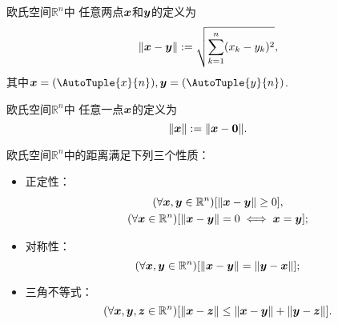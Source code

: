 \begin{definition}
欧氏空间\(\mathbb{R}^n\)中
任意两点\(\boldsymbol{x}\)和\(\boldsymbol{y}\)的定义为\begin{equation*}
	\norm{\boldsymbol{x} - \boldsymbol{y}}
	:=
	\sqrt{\sum_{k=1}^n (x_k-y_k)^2},
\end{equation*}
其中\(\vb{x}=(\AutoTuple{x}{n}),
\vb{y}=(\AutoTuple{y}{n})\).
\end{definition}
\begin{definition}
欧氏空间\(\mathbb{R}^n\)中
任意一点\(\boldsymbol{x}\)的定义为\begin{equation*}
	\norm{\boldsymbol{x}}
	:=
	\norm{\boldsymbol{x}-\boldsymbol0}.
\end{equation*}
\end{definition}
\begin{theorem}
欧氏空间\(\mathbb{R}^n\)中的距离满足下列三个性质：\begin{itemize}
	\item {\rm 正定性}：\begin{gather*}
		(\forall \boldsymbol{x},\boldsymbol{y}\in\mathbb{R}^n)
		[\norm{\boldsymbol{x}-\boldsymbol{y}}\geq0], \\
		(\forall \boldsymbol{x}\in\mathbb{R}^n)
		[\norm{\boldsymbol{x}-\boldsymbol{y}}=0 \iff \boldsymbol{x}=\boldsymbol{y}];
	\end{gather*}
	\item {\rm 对称性}：\begin{equation*}
		(\forall \boldsymbol{x},\boldsymbol{y}\in\mathbb{R}^n)
		[\norm{\boldsymbol{x}-\boldsymbol{y}}=\norm{\boldsymbol{y}-\boldsymbol{x}}];
	\end{equation*}
	\item {\rm 三角不等式}：\begin{equation*}
		(\forall \boldsymbol{x},\boldsymbol{y},\boldsymbol{z}\in\mathbb{R}^n)
		[\norm{\boldsymbol{x}-\boldsymbol{z}}\leq\norm{\boldsymbol{x}-\boldsymbol{y}}+\norm{\boldsymbol{y}-\boldsymbol{z}}].
	\end{equation*}
\end{itemize}
\end{theorem}

